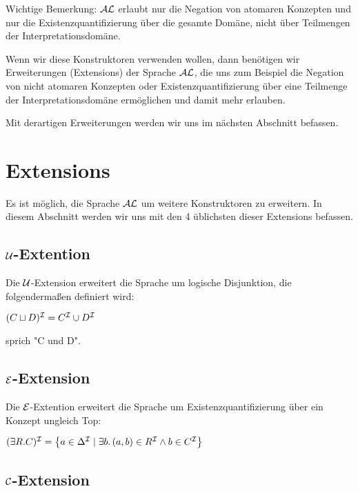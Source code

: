 \documentclass[runningheads,a4paper]{llncs}
\begin{document}
Wichtige Bemerkung: $\cal AL$ erlaubt nur die Negation von atomaren Konzepten und nur die Existenzquantifizierung über die gesamte Domäne, nicht über Teilmengen der Interpretationsdomäne.

Wenn wir diese Konstruktoren verwenden wollen, dann benötigen wir Erweiterungen (Extensions) der Sprache $\cal AL$, die uns zum Beispiel  die Negation von nicht atomaren Konzepten oder Existenzquantifizierung über eine Teilmenge der Interpretationsdomäne ermöglichen und damit mehr erlauben.

Mit derartigen Erweiterungen werden wir uns im nächsten Abschnitt befassen.

\section{Extensions}

Es ist möglich, die Sprache $\cal AL$ um weitere Konstruktoren zu erweitern. In diesem Abschnitt werden wir uns mit den 4 üblichsten dieser Extensions befassen.

\subsection{$\cal U$-Extention}

Die $\cal U$-Extension erweitert die Sprache um logische Disjunktion, die folgendermaßen definiert wird:

	\begin{center}
	$(C\sqcup D)^{\cal I}=C^{\cal I}\cup D^{\cal I} $
	\end{center}

sprich "C und D". 

\subsection{$\cal E$-Extension}

Die $\cal E$-Extention erweitert die Sprache um Existenzquantifizierung über ein Konzept ungleich Top:

	\begin{center}
	$(\exists R.C)^{\cal I}=\left\{a\in \Delta^{\cal I}\;|\;\exists b.\,(a,b)\in R^{\cal I}\wedge b\in C^{\cal I}\right\}$ 
	\end{center}


\subsection{$\cal C$-Extension}
\end{document}
